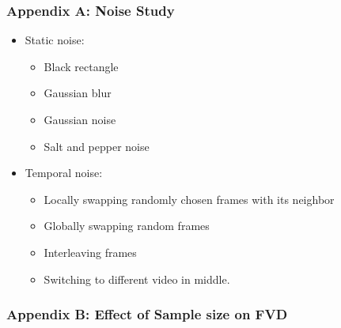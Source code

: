 \documentclass{article}
\begin{document}
    \subsubsection{Appendix A: Noise Study}\label{subsubsec:FVD_A_new_Metric_for_Video_Generation:appendix-a:-noise-study}
    \begin{itemize}
        \item Static noise:
        \begin{itemize}
            \item Black rectangle
            \item Gaussian blur
            \item Gaussian noise
            \item Salt and pepper noise
        \end{itemize}
        \item Temporal noise:
        \begin{itemize}
            \item Locally swapping randomly chosen frames with its neighbor
            \item Globally swapping random frames
            \item Interleaving frames
            \item Switching to different video in middle.
        \end{itemize}
    \end{itemize}

    \subsubsection{Appendix B: Effect of Sample size on FVD}\label{subsubsec:FVD_A_new_Metric_for_Video_Generation:appendix-b:-effect-of-sample-size-on-fvd}
\end{document}
